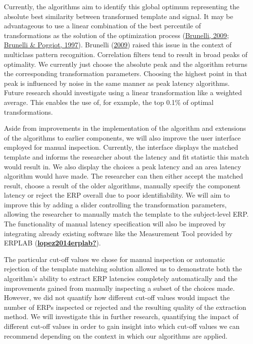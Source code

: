 \documentclass[
  man,floatsintext]{apa7}
\begin{document}
Currently, the algorithms aim to identify this global optimum representing the absolute best similarity between transformed template and signal. It may be advantageous to use a linear combination of the best percentile of transformations as the solution of the optimization process (\protect\hyperlink{ref-brunelli2009template}{Brunelli, 2009}; \protect\hyperlink{ref-brunelli1997template}{Brunelli \& Poggiot, 1997}). Brunelli (\protect\hyperlink{ref-brunelli2009template}{2009}) raised this issue in the context of multiclass pattern recognition. Correlation filters tend to result in broad peaks of optimality. We currently just choose the absolute peak and the algorithm returns the corresponding transformation parameters. Choosing the highest point in that peak is influenced by noise in the same manner as peak latency algorithms. Future research should investigate using a linear transformation like a weighted average. This enables the use of, for example, the top 0.1\% of optimal transformations.

Aside from improvements in the implementation of the algorithm and extensions of the algorithms to earlier components, we will also improve the user interface employed for manual inspection. Currently, the interface displays the matched template and informs the researcher about the latency and fit statistic this match would result in. We also display the choices a peak latency and an area latency algorithm would have made. The researcher can then either accept the matched result, choose a result of the older algorithms, manually specify the component latency or reject the ERP overall due to poor identifiability. We will aim to improve this by adding a slider controlling the transformation parameters, allowing the researcher to manually match the template to the subject-level ERP. The functionality of manual latency specification will also be improved by integrating already existing software like the Measurement Tool provided by ERPLAB (\protect\hyperlink{ref-lopez2014erplab}{\textbf{lopez2014erplab?}}).

The particular cut-off values we chose for manual inspection or automatic rejection of the template matching solution allowed us to demonstrate both the algorithm's ability to extract ERP latencies completely automatically and the improvements gained from manually inspecting a subset of the choices made. However, we did not quantify how different cut-off values would impact the number of ERPs inspected or rejected and the resulting quality of the extraction method. We will investigate this in further research, quantifying the impact of different cut-off values in order to gain insight into which cut-off values we can recommend depending on the context in which our algorithms are applied.
\end{document}
